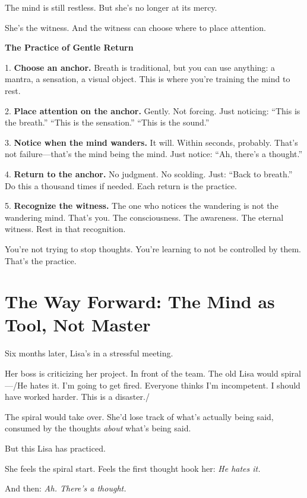\documentclass[11pt,twoside]{book}
\begin{document}
The mind is still restless. But she's no longer at its mercy.

She's the witness. And the witness can choose where to place attention.

\begin{practicebox}
\textbf{The Practice of Gentle Return}

1. \textbf{Choose an anchor.} Breath is traditional, but you can use anything: a mantra, a sensation, a visual object. This is where you're training the mind to rest.

2. \textbf{Place attention on the anchor.} Gently. Not forcing. Just noticing: ``This is the breath.'' ``This is the sensation.'' ``This is the sound.''

3. \textbf{Notice when the mind wanders.} It will. Within seconds, probably. That's not failure—that's the mind being the mind. Just notice: ``Ah, there's a thought.''

4. \textbf{Return to the anchor.} No judgment. No scolding. Just: ``Back to breath.'' Do this a thousand times if needed. Each return is the practice.

5. \textbf{Recognize the witness.} The one who notices the wandering is not the wandering mind. That's you. The consciousness. The awareness. The eternal witness. Rest in that recognition.

You're not trying to stop thoughts. You're learning to not be controlled by them. That's the practice.
\end{practicebox}

\section*{The Way Forward: The Mind as Tool, Not Master}

Six months later, Lisa's in a stressful meeting.

Her boss is criticizing her project. In front of the team. The old Lisa would spiral—/He hates it. I'm going to get fired. Everyone thinks I'm incompetent. I should have worked harder. This is a disaster./

The spiral would take over. She'd lose track of what's actually being said, consumed by the thoughts \emph{about} what's being said.

But this Lisa has practiced.

She feels the spiral start. Feels the first thought hook her: \emph{He hates it.}

And then: \emph{Ah. There's a thought.}
\end{document}
